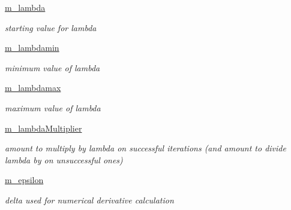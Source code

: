 \begin{DoxyCompactItemize}
\item 
\mbox{\label{classSignalIntegrity_1_1Fit_1_1LevMar_1_1LevMar_a2a7e7b39bfc7a6094ba7f3173dc4e571}} 
\hyperlink{classSignalIntegrity_1_1Fit_1_1LevMar_1_1LevMar_a2a7e7b39bfc7a6094ba7f3173dc4e571}{m\+\_\+lambda}
\begin{DoxyCompactList}\small\item\em starting value for lambda \end{DoxyCompactList}\item 
\mbox{\label{classSignalIntegrity_1_1Fit_1_1LevMar_1_1LevMar_a71c5d282ccf15f6d7b85d3ee4d5191bb}} 
\hyperlink{classSignalIntegrity_1_1Fit_1_1LevMar_1_1LevMar_a71c5d282ccf15f6d7b85d3ee4d5191bb}{m\+\_\+lambdamin}
\begin{DoxyCompactList}\small\item\em minimum value of lambda \end{DoxyCompactList}\item 
\mbox{\label{classSignalIntegrity_1_1Fit_1_1LevMar_1_1LevMar_a255cd226c6b1ca682c451ff25d530990}} 
\hyperlink{classSignalIntegrity_1_1Fit_1_1LevMar_1_1LevMar_a255cd226c6b1ca682c451ff25d530990}{m\+\_\+lambdamax}
\begin{DoxyCompactList}\small\item\em maximum value of lambda \end{DoxyCompactList}\item 
\mbox{\label{classSignalIntegrity_1_1Fit_1_1LevMar_1_1LevMar_a6f9afbdcacf8ccb23b7bf8ff291d4abb}} 
\hyperlink{classSignalIntegrity_1_1Fit_1_1LevMar_1_1LevMar_a6f9afbdcacf8ccb23b7bf8ff291d4abb}{m\+\_\+lambda\+Multiplier}
\begin{DoxyCompactList}\small\item\em amount to multiply by lambda on successful iterations (and amount to divide lambda by on unsuccessful ones) \end{DoxyCompactList}\item 
\mbox{\label{classSignalIntegrity_1_1Fit_1_1LevMar_1_1LevMar_a8b2c1114ff1557c8d2b3723a6c7b1c18}} 
\hyperlink{classSignalIntegrity_1_1Fit_1_1LevMar_1_1LevMar_a8b2c1114ff1557c8d2b3723a6c7b1c18}{m\+\_\+epsilon}
\begin{DoxyCompactList}\small\item\em delta used for numerical derivative calculation \end{DoxyCompactList}\end{DoxyCompactItemize}



